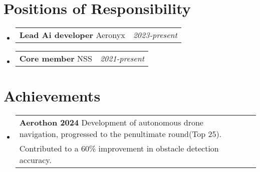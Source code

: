 \documentclass[a4paper,11pt]{article}
\makeatletter
\newcommand{\resumePOR}[3]{
\vspace{0.5mm}\item
    \begin{tabular*}{0.97\textwidth}[t]{l@{\extracolsep{\fill}}r}
        \textbf{#1}\hspace{0.3mm}#2 & \textit{\small{#3}} 
    \end{tabular*}
    \vspace{-2mm}
}
\newcommand{\resumeSubHeadingListStart}{\begin{itemize}[leftmargin=*,labelsep=0mm]}
\newcommand{\resumeSubHeadingListEnd}{\end{itemize}\vspace{2mm}}
\makeatother
\begin{document}
\section{\textbf{Positions of Responsibility}}
\vspace{-0.4mm}
\resumeSubHeadingListStart
\resumePOR{Lead Ai developer } %
    {Aeronyx} %
    {2023-present} %
\resumePOR{Core member } %
    {NSS} %
    {2021-present} %
\resumeSubHeadingListEnd
\vspace{-5mm}




\section{\textbf{Achievements}}
\vspace{-0.4mm}
\resumeSubHeadingListStart
\resumePOR{Aerothon 2024} %
    { Development of autonomous drone navigation, progressed to the penultimate round(Top 25). \\Contributed to a 60\% improvement in obstacle detection accuracy. } %
    {} %
    
\resumeSubHeadingListEnd
\vspace{-5mm}



\end{document}
